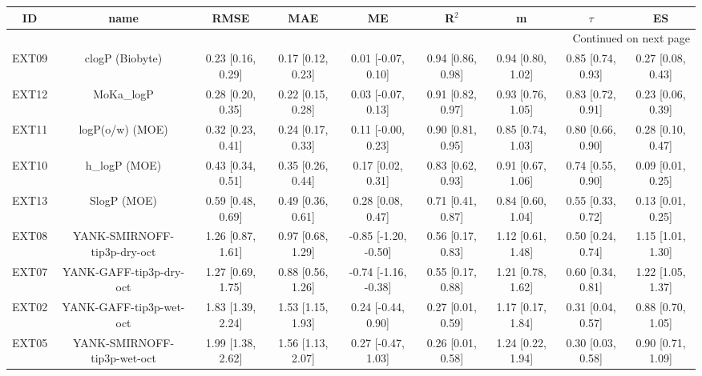 \documentclass{article}
\begin{document}
\begin{center}
\scriptsize
\begin{longtable}{|ccccccccc|}
\toprule
    ID &                            name &               RMSE &                MAE &                    ME &              R$^2$ &                   m &              $\tau$ &                 ES \\
\midrule
\endhead
\midrule
\multicolumn{9}{r}{{Continued on next page}} \\
\midrule
\endfoot

\bottomrule
\endlastfoot
 EXT09 &                 clogP (Biobyte) &  0.23 [0.16, 0.29] &  0.17 [0.12, 0.23] &    0.01 [-0.07, 0.10] &  0.94 [0.86, 0.98] &   0.94 [0.80, 1.02] &   0.85 [0.74, 0.93] &  0.27 [0.08, 0.43] \\
 EXT12 &                      MoKa\_logP &  0.28 [0.20, 0.35] &  0.22 [0.15, 0.28] &    0.03 [-0.07, 0.13] &  0.91 [0.82, 0.97] &   0.93 [0.76, 1.05] &   0.83 [0.72, 0.91] &  0.23 [0.06, 0.39] \\
 EXT11 &                 logP(o/w) (MOE) &  0.32 [0.23, 0.41] &  0.24 [0.17, 0.33] &    0.11 [-0.00, 0.23] &  0.90 [0.81, 0.95] &   0.85 [0.74, 1.03] &   0.80 [0.66, 0.90] &  0.28 [0.10, 0.47] \\
 EXT10 &                   h\_logP (MOE) &  0.43 [0.34, 0.51] &  0.35 [0.26, 0.44] &     0.17 [0.02, 0.31] &  0.83 [0.62, 0.93] &   0.91 [0.67, 1.06] &   0.74 [0.55, 0.90] &  0.09 [0.01, 0.25] \\
 EXT13 &                     SlogP (MOE) &  0.59 [0.48, 0.69] &  0.49 [0.36, 0.61] &     0.28 [0.08, 0.47] &  0.71 [0.41, 0.87] &   0.84 [0.60, 1.04] &   0.55 [0.33, 0.72] &  0.13 [0.01, 0.25] \\
 EXT08 &     YANK-SMIRNOFF-tip3p-dry-oct &  1.26 [0.87, 1.61] &  0.97 [0.68, 1.29] &  -0.85 [-1.20, -0.50] &  0.56 [0.17, 0.83] &   1.12 [0.61, 1.48] &   0.50 [0.24, 0.74] &  1.15 [1.01, 1.30] \\
 EXT07 &         YANK-GAFF-tip3p-dry-oct &  1.27 [0.69, 1.75] &  0.88 [0.56, 1.26] &  -0.74 [-1.16, -0.38] &  0.55 [0.17, 0.88] &   1.21 [0.78, 1.62] &   0.60 [0.34, 0.81] &  1.22 [1.05, 1.37] \\
 EXT02 &         YANK-GAFF-tip3p-wet-oct &  1.83 [1.39, 2.24] &  1.53 [1.15, 1.93] &    0.24 [-0.44, 0.90] &  0.27 [0.01, 0.59] &   1.17 [0.17, 1.84] &   0.31 [0.04, 0.57] &  0.88 [0.70, 1.05] \\
 EXT05 &     YANK-SMIRNOFF-tip3p-wet-oct &  1.99 [1.38, 2.62] &  1.56 [1.13, 2.07] &    0.27 [-0.47, 1.03] &  0.26 [0.01, 0.58] &   1.24 [0.22, 1.94] &   0.30 [0.03, 0.58] &  0.90 [0.71, 1.09] \\

\end{longtable}
\end{center}
\end{document}
